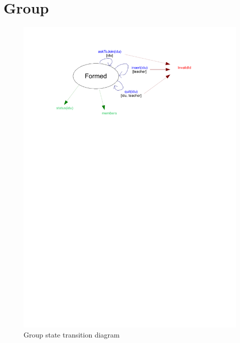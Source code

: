 \section{Group}
	\begin{figure}[ht]
			\begin{center}
				\includegraphics[width=\textwidth,  trim=2cm 18cm 2cm 1cm]{UML_figure/state_transition/dojo_logic/st_group.pdf}
				\caption{Group state transition diagram}
			\end{center}
	\end{figure}
\newpage
